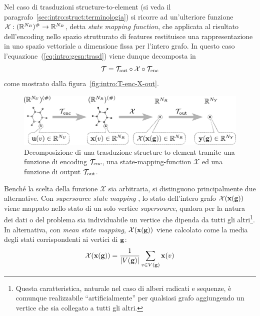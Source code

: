 Nel caso di trasduzioni structure-to-element (si veda il paragrafo~\ref{sec:intro:struct:terminologia}) si ricorre ad un'ulteriore funzione $\mathcal{X} : (\mathbb{R}^{N_R})^{\#} \rightarrow \mathbb{R}^{N_R}$, detta \emph{state mapping function}, che applicata al risultato dell'encoding nello spazio strutturato di features restituisce una rappresentazione in uno spazio vettoriale a dimensione fissa per l'intero grafo. In questo caso l'equazione~(\ref{eq:intro:gesn:trasd}) viene dunque decomposta in
\begin{equation}
\mathcal{T} = \mathcal{T}_\textup{out} \circ \mathcal{X} \circ \mathcal{T}_\textup{enc}
\end{equation}
come mostrato dalla figura~\vref{fig:intro:T-enc-X-out}.
\begin{figure}[tbp]
\centering
\includegraphics[width=\columnwidth]{img/T-enc-X-out}
\medskip
\caption[Decomposizione di una trasduzione structure-to-element.]{Decomposizione di una trasduzione structure-to-element tramite una funzione di encoding $\mathcal{T}_\textup{enc}$, una state-mapping-function $\mathcal{X}$ ed una funzione di output $\mathcal{T}_\textup{out}$.}
\label{fig:intro:T-enc-X-out}
\end{figure}

Benché la scelta della funzione $\mathcal{X}$ sia arbitraria, si distinguono principalmente due alternative. Con \emph{supersource state mapping} \cite{Gallicchio:TreeESN}, lo stato dell'intero grafo $\mathcal{X}(\mathbf{x}(\mathbf{g}))$ viene mappato nello stato di un solo vertice \emph{supersource}, qualora per la natura dei dati o del problema sia individuabile un vertice che dipenda da tutti gli altri\footnote{Questa caratteristica, naturale nel caso di alberi radicati e sequenze, è comunque realizzabile ``artificialmente'' per qualsiasi grafo aggiungendo un vertice che sia collegato a tutti gli altri.}. In alternativa, con \emph{mean state mapping}, $\mathcal{X}(\mathbf{x}(\mathbf{g}))$ viene calcolato come la media degli stati corrispondenti ai vertici di $\mathbf{g}$:
\begin{equation}\label{eq:meanstate}
\mathcal{X}(\mathbf{x}(\mathbf{g})) = \dfrac{1}{\lvert V(\mathbf{g})\rvert} \sum_{v \in V(\mathbf{g})} \mathbf{x}(v)
\end{equation}

